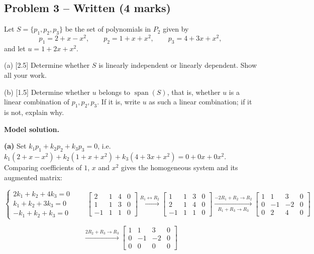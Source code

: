 \documentclass[11pt,a4paper]{article}
\begin{document}
\subsection*{Problem 3 -- Written (4 marks)}
Let $S=\{p_1,p_2,p_3\}$ be the set of polynomials in $P_2$ given by\[p_1=2+x-x^{2},\qquad p_2=1+x+x^{2},\qquad p_3=4+3x+x^{2},\]and let $u=1+2x+x^{2}$.\par (a) [2.5] Determine whether $S$ is linearly independent or linearly dependent. Show all your work.\par (b) [1.5] Determine whether $u$ belongs to $\operatorname{span}(S)$, that is, whether $u$ is a linear combination of $p_1,p_2,p_3$. If it is, write $u$ as such a linear combination; if it is not, explain why.\par
\textbf{Model solution.}\par{\color{WorkBlue}\textbf{(a)} Set $k_1p_1+k_2p_2+k_3p_3=0$, i.e. $k_1(2+x-x^{2})+k_2(1+x+x^{2})+k_3(4+3x+x^{2})=0+0x+0x^{2}$. Comparing coefficients of $1$, $x$ and $x^{2}$ gives the homogeneous system and its augmented matrix:

\[ \begin{cases}2k_1+k_2+4k_3=0\\ k_1+k_2+3k_3=0\\ -k_1+k_2+k_3=0\end{cases} \qquad \left[\begin{array}{ccc|c} 2 & 1 & 4 & 0 \\ 1 & 1 & 3 & 0 \\ -1 & 1 & 1 & 0 \end{array}\right] \xrightarrow{R_1 \leftrightarrow R_2} \left[\begin{array}{ccc|c} 1 & 1 & 3 & 0 \\ 2 & 1 & 4 & 0 \\ -1 & 1 & 1 & 0 \end{array}\right] \xrightarrow[R_1+R_3 \to R_3]{-2R_1+R_2 \to R_2} \left[\begin{array}{ccc|c} 1 & 1 & 3 & 0 \\ 0 & -1 & -2 & 0 \\ 0 & 2 & 4 & 0 \end{array}\right] \]

\[  \xrightarrow{2R_2+R_3 \to R_3} \left[\begin{array}{ccc|c} 1 & 1 & 3 & 0 \\ 0 & -1 & -2 & 0 \\ 0 & 0 & 0 & 0 \end{array}\right] \]

}
\end{document}
